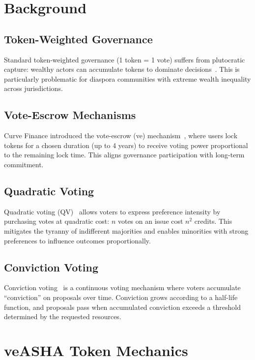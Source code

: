\documentclass[11pt,a4paper]{article}
\begin{document}
\section{Background}

\subsection{Token-Weighted Governance}

Standard token-weighted governance (1 token = 1 vote) suffers from plutocratic capture: wealthy actors can accumulate tokens to dominate decisions~\citep{buterin2018governance}. This is particularly problematic for diaspora communities with extreme wealth inequality across jurisdictions.

\subsection{Vote-Escrow Mechanisms}

Curve Finance introduced the vote-escrow (ve) mechanism~\citep{egorov2019curve}, where users lock tokens for a chosen duration (up to 4 years) to receive voting power proportional to the remaining lock time. This aligns governance participation with long-term commitment.

\subsection{Quadratic Voting}

Quadratic voting (QV)~\citep{posner2018radical} allows voters to express preference intensity by purchasing votes at quadratic cost: $n$ votes on an issue cost $n^2$ credits. This mitigates the tyranny of indifferent majorities and enables minorities with strong preferences to influence outcomes proportionally.

\subsection{Conviction Voting}

Conviction voting~\citep{de2019conviction} is a continuous voting mechanism where voters accumulate ``conviction'' on proposals over time. Conviction grows according to a half-life function, and proposals pass when accumulated conviction exceeds a threshold determined by the requested resources.

\section{veASHA Token Mechanics}
\end{document}
